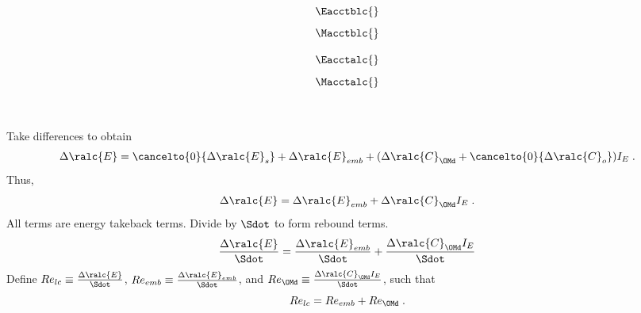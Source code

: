 

\begin{landscape}

\linespread{1}


\sectionsep{}

{
  \begin{equation}
  \Eacctblc{}
  \end{equation}
}
{
  \begin{equation}
  \Macctblc{}
  \end{equation}
}

\sectionsep{}

{
  \begin{equation}
  \Eacctalc{}
  \end{equation}
}
{
  \begin{equation}
  \Macctalc{}
  \end{equation}
}

\sectionsep{}

  \derivsection{}
{
    ~
    
    Take differences to obtain
  \begin{equation}
  \Delta \ralc{E} = \cancelto{0}{\Delta \ralc{E}_s}
  + \Delta \ralc{E}_{emb}
  + (\Delta \ralc{C}_{\OMd} + \cancelto{0}{\Delta \ralc{C}_o}) I_E \; .
  \end{equation}
  Thus, 
  \begin{equation}
  \Delta \ralc{E} = \Delta \ralc{E}_{emb} + \Delta \ralc{C}_{\OMd} I_E \; .
  \end{equation}
  All terms are energy takeback terms.
  Divide by $\Sdot$ to form rebound terms.
  \begin{equation}
  \frac{\Delta \ralc{E}}{\Sdot} = \frac{\Delta \ralc{E}_{emb}}{\Sdot} + \frac{\Delta \ralc{C}_{\OMd} I_E}{\Sdot}
  \end{equation}
  Define
  $Re_{lc} \equiv \frac{\Delta \ralc{E}}{\Sdot}$, 
  $Re_{emb} \equiv \frac{\Delta \ralc{E}_{emb}}{\Sdot}$, and
  $Re_{\OMd} \equiv \frac{\Delta \ralc{C}_{\OMd} I_E}{\Sdot}$,
  such that
  \begin{equation}
  Re_{lc} = Re_{emb} + Re_{\OMd} \; .
  \end{equation}
}
{
    ~
    
}
\end{landscape}
